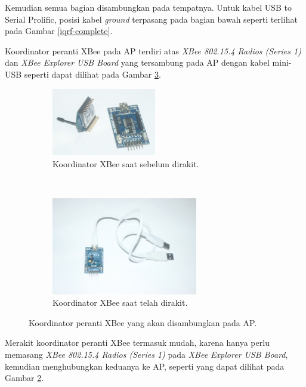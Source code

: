 			Kemudian semua bagian disambungkan pada tempatnya. Untuk kabel USB to Serial Prolific, posisi kabel \emph{ground} terpasang pada bagian bawah seperti terlihat pada Gambar \ref{iqrf-complete}.

			Koordinator peranti XBee pada AP terdiri atas \emph{XBee 802.15.4 Radios (Series 1)} dan \emph{XBee Explorer USB Board} yang tersambung pada AP dengan kabel mini-USB seperti dapat dilihat pada Gambar \ref{xbee-sink}.

			\begin{figure}[H]
				\begin{subfigure}[b]{\textwidth}
					\centering
				    \includegraphics[width=0.5\textwidth]{gambar/xbee-sink-stripped}
				    \caption{Koordinator XBee saat sebelum dirakit.}
				    \label{xbee-sink-stripped}
				\end{subfigure}
				 ~
				\begin{subfigure}[b]{\textwidth}
					\centering
				    \includegraphics[width=0.7\textwidth]{gambar/xbee-sink-complete}
				    \caption{Koordinator XBee saat telah dirakit.}
				    \label{xbee-sink-complete}
				\end{subfigure}
				\caption{Koordinator peranti XBee yang akan disambungkan pada AP.}
				\label{xbee-sink}
			\end{figure}

			Merakit koordinator peranti XBee termasuk mudah, karena hanya perlu memasang \emph{XBee 802.15.4 Radios (Series 1)} pada \emph{XBee Explorer USB Board}, kemudian menghubungkan keduanya ke AP, seperti yang dapat dilihat pada Gambar \ref{xbee-sink-complete}.

